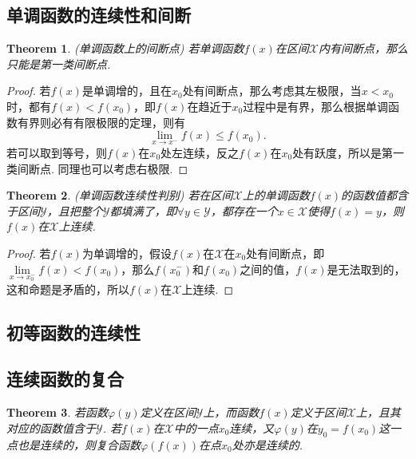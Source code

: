 \documentclass{article}
\newtheorem{theorem}{Theorem}[section]
\begin{document}
\subsection{单调函数的连续性和间断}

\begin{theorem}
\rm {\color{red} (单调函数上的间断点)} 若单调函数$f(x)$在区间$\mathcal{X}$内有间断点，那么只能是第一类间断点.
\end{theorem}

\begin{proof}
若$f(x)$是单调增的，且在$x_0$处有间断点，那么考虑其左极限，当$x < x_0$时，都有$f(x) < f(x_0)$，即$f(x)$在趋近于$x_0$过程中是有界，那么根据单调函数有界则必有有限极限的定理，则有
$$
\lim\limits_{x \rightarrow x^-} f(x) \leq f(x_0).
$$
若可以取到等号，则$f(x)$在$x_0$处左连续，反之$f(x)$在$x_0$处有跃度，所以是第一类间断点. 同理也可以考虑右极限.
\end{proof}

\begin{theorem}
\rm {\color{red} (单调函数连续性判别)} 若在区间$\mathcal{X}$上的单调函数$f(x)$的函数值都含于区间$\mathcal{Y}$，且把整个$\mathcal{Y}$都填满了，即$\forall y \in \mathcal{Y}$，都存在一个$x \in \mathcal{X}$使得$f(x) = y$，则$f(x)$在$\mathcal{X}$上连续.
\end{theorem}

\begin{proof}
若$f(x)$为单调增的，假设$f(x)$在$\mathcal{X}$在$x_0$处有间断点，即$\lim\limits_{x \rightarrow x_0 ^-} f(x) < f(x_0)$，那么$f(x_0^-)$和$f(x_0)$之间的值，$f(x)$是无法取到的，这和命题是矛盾的，所以$f(x)$在$\mathcal{X}$上连续.
\end{proof}

\subsection{初等函数的连续性}

\subsection{连续函数的复合}

\begin{theorem}
若函数$\varphi(y)$定义在区间$\mathcal{Y}$上，而函数$f(x)$定义于区间$\mathcal{X}$上，且其对应的函数值含于$\mathcal{Y}$. 若$f(x)$在$\mathcal{X}$中的一点$x_0$连续，又$\varphi(y)$在$y_0 = f(x_0)$这一点也是连续的，则复合函数$\varphi(f(x))$在点$x_0$处亦是连续的.
\end{theorem}
\end{document}

